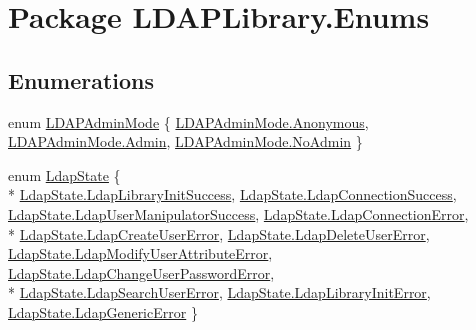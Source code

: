 \hypertarget{namespace_l_d_a_p_library_1_1_enums}{}\section{Package L\+D\+A\+P\+Library.\+Enums}
\label{namespace_l_d_a_p_library_1_1_enums}
\subsection*{Enumerations}
\begin{DoxyCompactItemize}
\item 
enum \hyperlink{namespace_l_d_a_p_library_1_1_enums_aaaf5c3ff906b84752d719f58d502f15e}{L\+D\+A\+P\+Admin\+Mode} \{ \hyperlink{namespace_l_d_a_p_library_1_1_enums_aaaf5c3ff906b84752d719f58d502f15ea7079c72c21415131774625ba1d64f4b0}{L\+D\+A\+P\+Admin\+Mode.\+Anonymous}, 
\hyperlink{namespace_l_d_a_p_library_1_1_enums_aaaf5c3ff906b84752d719f58d502f15eae3afed0047b08059d0fada10f400c1e5}{L\+D\+A\+P\+Admin\+Mode.\+Admin}, 
\hyperlink{namespace_l_d_a_p_library_1_1_enums_aaaf5c3ff906b84752d719f58d502f15eaef7bd0fbfff40a6c9fee16de42bcb4e5}{L\+D\+A\+P\+Admin\+Mode.\+No\+Admin}
 \}
\item 
enum \hyperlink{namespace_l_d_a_p_library_1_1_enums_a052eaa58cba3f62d4c008a3b1b347e03}{Ldap\+State} \{ \\*
\hyperlink{namespace_l_d_a_p_library_1_1_enums_a052eaa58cba3f62d4c008a3b1b347e03af4159a8076d86e306bf4af6e7ccb4a2e}{Ldap\+State.\+Ldap\+Library\+Init\+Success}, 
\hyperlink{namespace_l_d_a_p_library_1_1_enums_a052eaa58cba3f62d4c008a3b1b347e03a5511b688e8046ddba89c072a7c6de585}{Ldap\+State.\+Ldap\+Connection\+Success}, 
\hyperlink{namespace_l_d_a_p_library_1_1_enums_a052eaa58cba3f62d4c008a3b1b347e03a89066db6310d53e1796bde034ee439f5}{Ldap\+State.\+Ldap\+User\+Manipulator\+Success}, 
\hyperlink{namespace_l_d_a_p_library_1_1_enums_a052eaa58cba3f62d4c008a3b1b347e03a5c480724e4ddca90039320c0fd140651}{Ldap\+State.\+Ldap\+Connection\+Error}, 
\\*
\hyperlink{namespace_l_d_a_p_library_1_1_enums_a052eaa58cba3f62d4c008a3b1b347e03a565053a3143d2579cf29fdf26de08c2a}{Ldap\+State.\+Ldap\+Create\+User\+Error}, 
\hyperlink{namespace_l_d_a_p_library_1_1_enums_a052eaa58cba3f62d4c008a3b1b347e03a5c4eaa31c47492f2bff481e64d7952ab}{Ldap\+State.\+Ldap\+Delete\+User\+Error}, 
\hyperlink{namespace_l_d_a_p_library_1_1_enums_a052eaa58cba3f62d4c008a3b1b347e03aecdd1154672e2a046624a79aca635478}{Ldap\+State.\+Ldap\+Modify\+User\+Attribute\+Error}, 
\hyperlink{namespace_l_d_a_p_library_1_1_enums_a052eaa58cba3f62d4c008a3b1b347e03ac896d31c9e9903cef611e9e446b7e2e9}{Ldap\+State.\+Ldap\+Change\+User\+Password\+Error}, 
\\*
\hyperlink{namespace_l_d_a_p_library_1_1_enums_a052eaa58cba3f62d4c008a3b1b347e03abc31b63af4aef5b342d4cd01834d4994}{Ldap\+State.\+Ldap\+Search\+User\+Error}, 
\hyperlink{namespace_l_d_a_p_library_1_1_enums_a052eaa58cba3f62d4c008a3b1b347e03ab1afbbf4a11d2a4941fc31381fa91512}{Ldap\+State.\+Ldap\+Library\+Init\+Error}, 
\hyperlink{namespace_l_d_a_p_library_1_1_enums_a052eaa58cba3f62d4c008a3b1b347e03a83e05155e20d594e3b7894c919a8020b}{Ldap\+State.\+Ldap\+Generic\+Error}
 \}
\end{DoxyCompactItemize}


